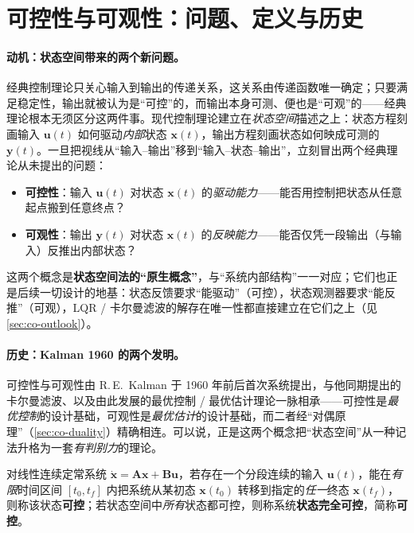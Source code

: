\section{可控性与可观性：问题、定义与历史}
\label{sec:co-def}

\paragraph{动机：状态空间带来的两个新问题。}
经典控制理论只关心输入到输出的传递关系，这关系由传递函数唯一确定；只要满足稳定性，输出就被认为是“可控”的，而输出本身可测、便也是“可观”的——经典理论根本无须区分这两件事\cite{liubao2006modern}。现代控制理论建立在\emph{状态空间}描述之上：状态方程刻画输入 $\mathbf{u}(t)$ 如何驱动\emph{内部}状态 $\mathbf{x}(t)$，输出方程刻画状态如何映成可测的 $\mathbf{y}(t)$。一旦把视线从“输入--输出”移到“输入--状态--输出”，立刻冒出两个经典理论从未提出的问题：

\begin{itemize}
  \item \textbf{可控性}：输入 $\mathbf{u}(t)$ 对状态 $\mathbf{x}(t)$ 的\emph{驱动能力}——能否用控制把状态从任意起点搬到任意终点？
  \item \textbf{可观性}：输出 $\mathbf{y}(t)$ 对状态 $\mathbf{x}(t)$ 的\emph{反映能力}——能否仅凭一段输出（与输入）反推出内部状态？
\end{itemize}

\noindent 这两个概念是\textbf{状态空间法的“原生概念”}，与“系统内部结构”一一对应；它们也正是后续一切设计的地基：状态反馈要求“能驱动”（可控），状态观测器要求“能反推”（可观），LQR / 卡尔曼滤波的解存在唯一性都直接建立在它们之上（见 \cref{sec:co-outlook}）。

\paragraph{历史：Kalman 1960 的两个发明。}
可控性与可观性由 R.\,E.\ Kalman 于 1960 年前后首次系统提出\cite{kalman1960general,kalman1963mathematical}，与他同期提出的卡尔曼滤波\cite{kalman1960new}、以及由此发展的最优控制 / 最优估计理论一脉相承——可控性是\emph{最优控制}的设计基础，可观性是\emph{最优估计}的设计基础，而二者经“对偶原理”（\cref{sec:co-duality}）精确相连。可以说，正是这两个概念把“状态空间”从一种记法升格为一套\emph{有判别力}的理论。

\begin{definition}\label{def:co-controllable}
对线性连续定常系统 $\dot{\mathbf{x}}=\mathbf{A}\mathbf{x}+\mathbf{B}\mathbf{u}$，若存在一个分段连续的输入 $\mathbf{u}(t)$，能在\emph{有限}时间区间 $[t_0,t_f]$ 内把系统从某初态 $\mathbf{x}(t_0)$ 转移到指定的\emph{任一}终态 $\mathbf{x}(t_f)$，则称该状态\textbf{可控}；若状态空间中\emph{所有}状态都可控，则称系统\textbf{状态完全可控}，简称\textbf{可控}\cite{liubao2006modern}。
\end{definition}

